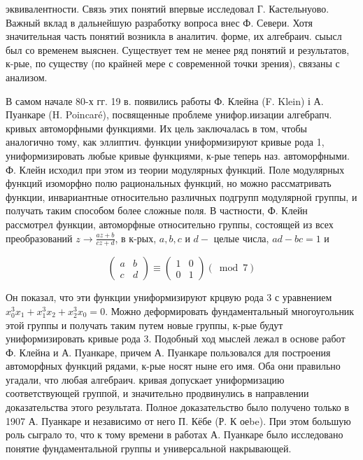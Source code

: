 \documentclass[10pt]{article}
\begin{document}
эквивалентности. Связь этих понятий впервые исследовал Г. Кастельнуово. Важный вклад в дальнейшую разработку вопроса внес Ф. Севери. Хотя значительная часть понятий возникла в аналитич. форме, их алгебраич. сыысл был со временем выяснен. Существует тем не менее ряд понятий и результатов, к-рые, по существу (по крайней мере с современной точки зрения), связаны с анализом.



В самом начале 80-х гг. 19 в. появились работы Ф. Клейна (F. Klein) і А. Пуанкаре (H. Poincaré), посвященные проблеме унифор.иизации алгебрапч. кривых автоморфными функциями. Их цель заключалась в том, чтобы аналогично тому, как эллиптич. функции униформизируют кривые рода 1, униформизировать любые кривые функциями, к-рые теперь наз. автоморфными. Ф. Клейн исходил при этом из теории модулярных функций. Поле модулярных функций изоморфно полю рациональных функций, но можно рассматривать функции, инвариантные относительно различных подгрупп модулярной группы, и получать таким способом более сложные поля. В частности, Ф. Клейн рассмотрел функции, автоморфные относительно группы, состоящей из всех преобразований $z \rightarrow \frac{a z+b}{c z+d}$, в к-рых, $a, b, c$ и $d-$ целые числа, $a d-b c=1$ и



\[

\left(\begin{array}{ll}

a & b \\

c & d

\end{array}\right) \equiv\left(\begin{array}{ll}

1 & 0 \\

0 & 1

\end{array}\right)(\bmod 7)

\]



Он показал, что эти функции униформизируют крцвую рода 3 с уравнением $x_{0}^{3} x_{1}+x_{1}^{3} x_{2}+x_{2}^{3} x_{0}=0$. Можно деформировать фундаментальный многоугольник этой группы и получать таким путем новые группы, к-рые будут униформизировать кривые рода 3. Подобный ход мыслей лежал в основе работ Ф. Клейна и А. Пуанкаре, причем А. Пуанкаре пользовался для построения автоморфных функций рядами, к-рые носят ныне его имя. Оба они правильно угадали, что любая алгебраич. кривая допускает униформизацию соответствующей группой, и значительно продвинулись в направлении доказательства этого результата. Полное доказательство было получено только в 1907 А. Пуанкаре и независимо от него П. Кёбе (Р. К оеbe). При этом большую роль сыграло то, что к тому времени в работах А. Пуанкаре было исследовано понятие фундаментальной группы и универсальной накрывающей.
\end{document}
